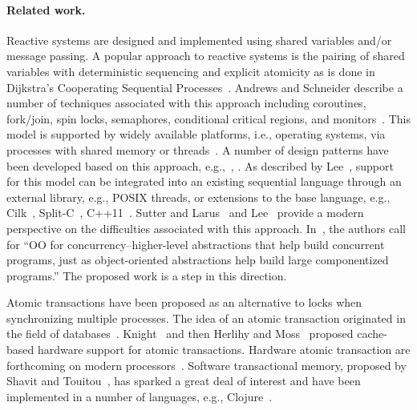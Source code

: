 \paragraph{Related work.}
Reactive systems are designed and implemented using shared variables and/or message passing.
A popular approach to reactive systems is the pairing of shared variables with deterministic sequencing and explicit atomicity as is done in Dijkstra's Cooperating Sequential Processes~\cite{dijkstra1965cooperating}.
Andrews and Schneider describe a number of techniques associated with this approach including coroutines, fork/join, spin locks, semaphores, conditional critical regions, and monitors~\cite{andrews1983concepts}.
This model is supported by widely available platforms, i.e., operating systems, via processes with shared memory or threads~\cite{silberschatz2005operating}.
A number of design patterns have been developed based on this approach, e.g.,~\cite{schmidt2000pattern}, \cite{lea2000concurrent}.
As described by Lee~\cite{lee2006problem}, support for this model can be integrated into an existing sequential language through an external library, e.g., POSIX threads, or extensions to the base language, e.g., Cilk~\cite{blumofe1995cilk}, Split-C~\cite{culler1993parallel}, C++11~\cite{cxx11}.
Sutter and Larus~\cite{sutter2005software} and Lee~\cite{lee2006problem} provide a modern perspective on the difficulties associated with this approach.
In~\cite{sutter2005software}, the authors call for ``OO for concurrency--higher-level abstractions that help build concurrent programs, just as object-oriented abstractions help build large componentized programs.''
The proposed work is a step in this direction.

Atomic transactions have been proposed as an alternative to locks when synchronizing multiple processes.
The idea of an atomic transaction originated in the field of databases~\cite{Eswaran:1976:NCP:360363.360369}.
Knight~\cite{Knight:1986:AMF:319838.319854} and then Herlihy and Moss~\cite{Herlihy:1993:TMA:165123.165164} proposed cache-based hardware support for atomic transactions.
Hardware atomic transaction are forthcoming on modern processors~\cite{haswell}.
Software transactional memory, proposed by Shavit and Touitou~\cite{shavit1997software}, has sparked a great deal of interest and have been implemented in a number of languages, e.g., Clojure~\cite{halloway2009programming}.

